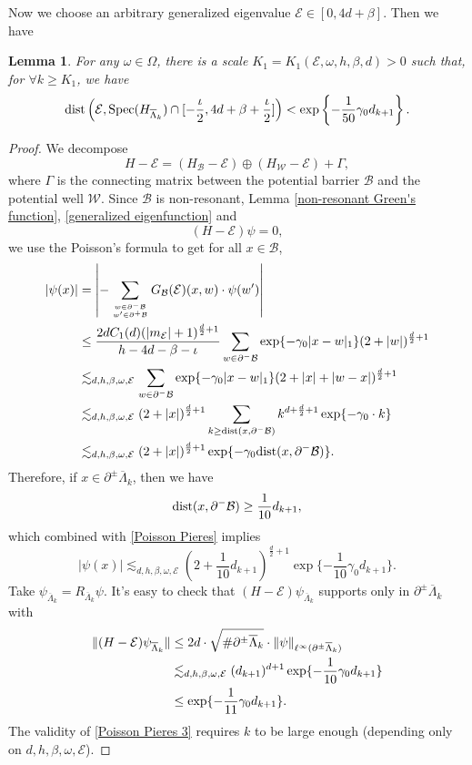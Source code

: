 \documentclass[11pt,reqno,UTF8,twoside]{amsart}
\newcommand{\spec}{{\rm Spec}}
\newcommand{\barLambda}{\overline{\Lambda}}
\newcommand{\mcB}{\mathcal{B}}
\newcommand{\mcE}{\mathcal{E}}
\newcommand{\mcW}{\mathcal{W}}
\newcommand{\dist}{{\rm dist}}
\newtheorem{lem}[thm]{Lemma}
\theoremstyle{definition}
\numberwithin{equation}{section}
\begin{document}
Now we choose an arbitrary generalized eigenvalue $\mcE\in [0,4d+\beta]$. Then  we have 
\begin{lem}
  For any $\omega\in\Omega$, there is a scale $K_1=K_1(\mcE,\omega,h,\beta,d)>0$  such that, for  $\forall k\geq K_1$, we have 
  \begin{equation}\label{approximate the generalized eigenvalue}
      \dist\left(\mcE,\spec(H_{\barLambda_k})\cap [-\frac{\iota}{2},4d+\beta+\frac{\iota}{2}]\right)< \exp\left\{  -\frac{1}{50}\gamma_0 d_{k+1}      \right\}.
  \end{equation}

\end{lem}
\begin{proof}
We decompose 
\[H-\mcE = (H_{\mcB}-\mcE)\oplus (H_{\mcW}-\mcE)+\Gamma,\]
where $\Gamma$ is the connecting matrix between the potential barrier $\mcB$ and the potential well $\mcW$. Since  $\mcB$ is non-resonant, Lemma \ref{non-resonant Green's function}, \eqref{generalized eigenfunction} and
\[(H-\mcE)\psi=0,\]
we use the Poisson's formula to get for all $x\in \mcB$,
\begin{align}\label{Poisson Pieres}
  |\psi(x)|&=\left|   -\sum_{w\in \partial^-\mcB \atop w'\in \partial^+\mcB } G_{\mcB}(\mcE)(x,w) \cdot \psi(w')     \right| \\
\notag  &\leq \frac{2d C_1(d) (|m_{\mcE}|+1)^{\frac{d}{2}+1}}{h-4d-\beta-\iota}  \sum_{w\in \partial^-\mcB} \exp\{-\gamma_0 |x-w|_1\} (2+|w|)^{\frac{d}{2}+1} \\
 \notag & \lesssim_{d,h,\beta,\omega,\mcE } \sum_{w\in \partial^-\mcB} \exp\{-\gamma_0 |x-w|_1\} (2+|x|+|w-x|)^{\frac{d}{2}+1} \\
 \notag &   \lesssim_{d,h,\beta,\omega,\mcE } (2+|x|)^{\frac{d}{2}+1} \sum_{k \geq \dist(x,\partial^-\mcB)} k^{d+\frac{d}{2}+1} \exp\{-\gamma_0 \cdot k\} \\
\notag & \lesssim_{d,h,\beta,\omega,\mcE } (2+|x|)^{\frac{d}{2}+1} \exp \{-\gamma_0 \dist(x,\partial^-\mcB) \}.
\end{align}
Therefore, if $x\in \partial^{\pm}\barLambda_k$, then we have 
\[\dist(x,\partial^-\mcB) \geq \frac{1}{10}d_{k+1},\]
which combined with \eqref{Poisson Pieres} implies 
\begin{equation}\label{Poisson Pieres 2}
  |\psi(x)| \lesssim_{d,h,\beta,\omega,\mcE } (2+\frac{1}{10}d_{k+1})^{\frac{d}{2}+1} \exp \{-\frac{1}{10}\gamma_0 d_{k+1} \}.
\end{equation} 
Take $\psi_{\barLambda_k}=R_{\barLambda_k}\psi$. It's easy to check that $(H-\mcE)\psi_{\barLambda_k}$ supports only in $\partial^{\pm}\barLambda_k$  with 
\begin{align}\label{Poisson Pieres 3}
 \notag \| (H-\mcE) \psi_{\barLambda_k} \| & \leq 2d\cdot \sqrt{\# \partial^{\pm}\barLambda_k} \cdot \| \psi \|_{\ell^{\infty}( \partial^{\pm}\barLambda_k )} \\
     \notag  & \lesssim_{d,h,\beta,\omega,\mcE } (d_{k+1})^{{d}+1} \exp \{-\frac{1}{10}\gamma_0 d_{k+1} \} \\
         &\leq \exp\{-\frac{1}{11}\gamma_0 d_{k+1}\}. 
\end{align}
The validity of \eqref{Poisson Pieres 3} requires $k$ to be  large enough (depending only on $d,h,\beta,\omega,\mcE$). 


\end{proof}
\end{document}
